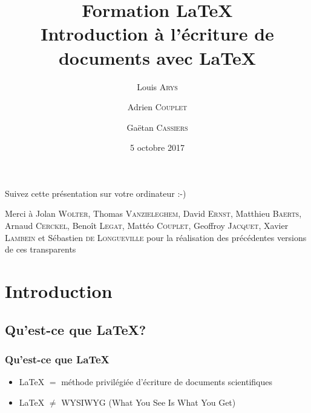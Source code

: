 \documentclass[10pt,svgnames,usenames,table]{beamer} %
\institute{Louvain-li-Nux}
\title{\textbf{Formation \LaTeX}\\
Introduction à l'écriture de documents avec \LaTeX}
\author{Louis \textsc{Arys} \and Adrien \textsc{Couplet} \and Gaëtan \textsc{Cassiers}}
\date{5 octobre 2017}
\begin{document}

\begin{frame}
  \begin{center}\Large
  Suivez cette présentation sur votre ordinateur :-)
  
  \vspace{1cm}
  \end{center}
\end{frame}


\begin{frame}
  \maketitle  
  Merci à Jolan \textsc{Wolter}, Thomas \textsc{Vanzieleghem}, David \textsc{Ernst}, Matthieu \textsc{Baerts}, Arnaud \textsc{Cerckel}, Benoît \textsc{Legat}, Mattéo \textsc{Couplet}, Geoffroy \textsc{Jacquet}, Xavier \textsc{Lambein} et Sébastien \textsc{de Longueville} pour la réalisation des précédentes versions de ces transparents

\end{frame}


\section{Introduction}
\subsection{Qu'est-ce que \LaTeX{}?}
\begin{frame}
\frametitle{Qu'est-ce que \LaTeX}

\begin{itemize}
\item \LaTeX{} $=$ méthode privilégiée d'écriture de documents scientifiques
 \vspace{0.5cm}
\item \LaTeX{} $ \neq$ WYSIWYG (What You See Is What You Get)
\end{itemize}

\end{frame}
\end{document}

